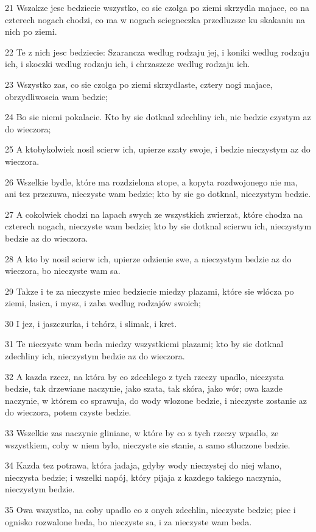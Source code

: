\par 21 Wszakze jesc bedziecie wszystko, co sie czolga po ziemi skrzydla majace, co na czterech nogach chodzi, co ma w nogach sciegneczka przedluzsze ku skakaniu na nich po ziemi.
\par 22 Te z nich jesc bedziecie: Szarancza wedlug rodzaju jej, i koniki wedlug rodzaju ich, i skoczki wedlug rodzaju ich, i chrzaszcze wedlug rodzaju ich.
\par 23 Wszystko zas, co sie czolga po ziemi skrzydlaste, cztery nogi majace, obrzydliwoscia wam bedzie;
\par 24 Bo sie niemi pokalacie. Kto by sie dotknal zdechliny ich, nie bedzie czystym az do wieczora;
\par 25 A ktobykolwiek nosil scierw ich, upierze szaty swoje, i bedzie nieczystym az do wieczora.
\par 26 Wszelkie bydle, które ma rozdzielona stope, a kopyta rozdwojonego nie ma, ani tez przezuwa, nieczyste wam bedzie; kto by sie go dotknal, nieczystym bedzie.
\par 27 A cokolwiek chodzi na lapach swych ze wszystkich zwierzat, które chodza na czterech nogach, nieczyste wam bedzie; kto by sie dotknal scierwu ich, nieczystym bedzie az do wieczora.
\par 28 A kto by nosil scierw ich, upierze odzienie swe, a nieczystym bedzie az do wieczora, bo nieczyste wam sa.
\par 29 Takze i te za nieczyste miec bedziecie miedzy plazami, które sie wlócza po ziemi, lasica, i mysz, i zaba wedlug rodzajów swoich;
\par 30 I jez, i jaszczurka, i tchórz, i slimak, i kret.
\par 31 Te nieczyste wam beda miedzy wszystkiemi plazami; kto by sie dotknal zdechliny ich, nieczystym bedzie az do wieczora.
\par 32 A kazda rzecz, na która by co zdechlego z tych rzeczy upadlo, nieczysta bedzie, tak drzewiane naczynie, jako szata, tak skóra, jako wór; owa kazde naczynie, w którem co sprawuja, do wody wlozone bedzie, i nieczyste zostanie az do wieczora, potem czyste bedzie.
\par 33 Wszelkie zas naczynie gliniane, w które by co z tych rzeczy wpadlo, ze wszystkiem, coby w niem bylo, nieczyste sie stanie, a samo stluczone bedzie.
\par 34 Kazda tez potrawa, która jadaja, gdyby wody nieczystej do niej wlano, nieczysta bedzie; i wszelki napój, który pijaja z kazdego takiego naczynia, nieczystym bedzie.
\par 35 Owa wszystko, na coby upadlo co z onych zdechlin, nieczyste bedzie; piec i ognisko rozwalone beda, bo nieczyste sa, i za nieczyste wam beda.
